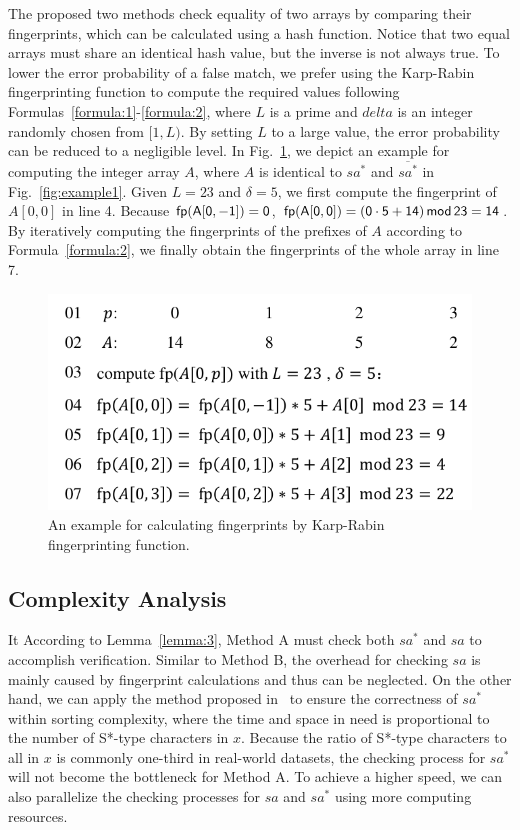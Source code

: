 \documentclass[10pt,journal,compsoc]{IEEEtran}
\begin{document}
The proposed two methods check equality of two arrays by comparing their fingerprints, which can be calculated using a hash function. Notice that two equal arrays must share an identical hash value, but the inverse is not always true. To lower the error probability of a false match, we prefer using the Karp-Rabin fingerprinting function to compute the required values following Formulas~\ref{formula:1}-\ref{formula:2}, where $L$ is a prime and $delta$ is an integer randomly chosen from $[1, L)$. By setting $L$ to a large value, the error probability can be reduced to a negligible level. In Fig.~\ref{fig:example2}, we depict an example for computing the integer array $A$, where $A$ is identical to $sa^*$ and $\overline{sa^*}$ in Fig.~\ref{fig:example1}. Given $L = 23$ and $\delta = 5$, we first compute the fingerprint of $A[0, 0]$ in line 4. Because $\sf fp(A[0, -1]) = 0$, $\sf fp(A[0, 0]) = (0 \cdot 5 + 14) \, mod \, 23 = 14$. By iteratively computing the fingerprints of the prefixes of $A$ according to Formula~\ref{formula:2}, we finally obtain the fingerprints of the whole array in line 7.

\begin{figure}[htbp!]
	\centering
	
	\includegraphics[width = 1\columnwidth]{example2.pdf}
	
	\caption{An example for calculating fingerprints by Karp-Rabin fingerprinting function.}
	
	\label{fig:example2}
	
\end{figure}

\subsection{Complexity Analysis}

It 
According to Lemma~\ref{lemma:3}, Method A must check both $sa^*$ and $sa$ to accomplish verification. Similar to Method B, the overhead for checking $sa$ is mainly caused by fingerprint calculations and thus can be neglected. On the other hand, we can apply the method proposed in~\cite{wu2017} to ensure the correctness of $sa^*$ within sorting complexity, where the time and space in need is proportional to the number of S*-type characters in $x$. Because the ratio of S*-type characters to all in $x$ is commonly one-third in real-world datasets, the checking process for $sa^*$ will not become the bottleneck for Method A. To achieve a higher speed, we can also parallelize the checking processes for $sa$ and $sa^*$ using more computing resources.
\end{document}
